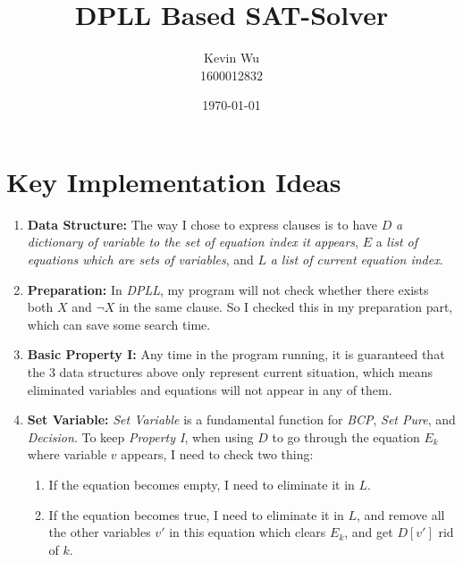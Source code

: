 \documentclass[a4paper,10pt]{article}
\title{DPLL Based SAT-Solver}
\author{Kevin Wu\\1600012832}
\date{\today}
\begin{document}
\maketitle
\vspace{-20pt}
\section{Key Implementation Ideas}
\begin{enumerate}
\setlength{\itemsep}{.1em}
\item \textbf{Data Structure:} The way I chose to express clauses is to have $D$  
    \textit{a dictionary of variable to the set of equation index it appears}, $E$ a 
    \textit{list of equations which are sets of variables}, and $L$ \textit{a list of current
    equation index}.
\item \textbf{Preparation:}
    In \textit{DPLL}, my program will not check whether there exists both $X$ and
    $\neg X$ in the same clause. So I checked this in my preparation part, which can
    save some search time.
\item \textbf{Basic Property I:} Any time in the program running, it is guaranteed
    that the $3$ data structures above
    only represent current situation, which means eliminated variables and 
    equations will not appear in any of them.
\item \textbf{Set Variable:} \textit{Set Variable} is a fundamental function for \textit{BCP},
    \textit{Set Pure}, and \textit{Decision}.
    To keep \textit{Property I}, when using $D$ to go through
    the equation $E_k$ where variable $v$ appears,
    I need to check two thing: 
    \begin{enumerate}
        \small\setlength{\itemsep}{.1em}
        \item If the equation becomes empty, I need to eliminate it in $L$.
        \item If the equation becomes true, I need to eliminate it in $L$,
            and remove all the other variables $v'$ in this equation which clears $E_k$,
            and get $D[v']$ rid of $k$.
    \end{enumerate}

\end{enumerate}
\end{document}
